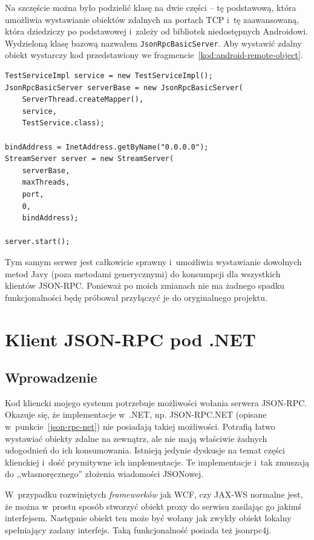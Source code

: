 Na szczęście można było podzielić klasę na dwie części -- tę podstawową, która umożliwia wystawianie obiektów zdalnych na portach TCP i~tę zaawansowaną, która dziedziczy po podstawowej i~zależy od bibliotek niedostępnych Androidowi.
Wydzieloną klasę bazową nazwałem \texttt{JsonRpcBasicServer}. Aby wystawić zdalny obiekt wystarczy kod przedstawiony we fragmencie~\ref{kod:android-remote-object}.

\begin{lstlisting}[float, frame=single, caption={Tworzenie obiektu zdalnego przy pomocy jsonrpc4j dostosowanego do Androida.}, label=kod:android-remote-object]
TestServiceImpl service = new TestServiceImpl();
JsonRpcBasicServer serverBase = new JsonRpcBasicServer(
    ServerThread.createMapper(),
    service,
    TestService.class);
		
bindAddress = InetAddress.getByName("0.0.0.0");
StreamServer server = new StreamServer(
    serverBase,
    maxThreads,
    port,
    0,
    bindAddress);

server.start();
\end{lstlisting}

Tym samym serwer jest całkowicie sprawny i~umożliwia wystawianie dowolnych metod Javy (poza metodami generycznymi) do konsumpcji dla wszystkich klientów JSON-RPC.
Ponieważ po moich zmianach nie ma żadnego spadku funkcjonalności będę próbował przyłączyć je do oryginalnego projektu.



\section{Klient JSON-RPC pod .NET}
\subsection{Wprowadzenie}
Kod kliencki mojego systemu potrzebuje możliwości wołania serwera JSON-RPC.
Okazuje się, że implementacje w~.NET, np. JSON-RPC.NET (opisane w~punkcie~\ref{json-rpc-net}) nie posiadają takiej możliwości.
Potrafią łatwo wystawiać obiekty zdalne na zewnątrz, ale nie mają właściwie żadnych udogodnień do ich konsumowania.
Istnieją jedynie dyskusje na temat części klienckiej i~dość prymitywne ich implementacje.
Te implementacje i~tak zmuszają do ,,własnoręcznego'' złożenia wiadomości JSONowej\cite{json-rpc-net-client}.

W~przypadku rozwiniętych \emph{frameworków} jak WCF, czy JAX-WS normalne jest, że można w~prostu sposób stworzyć obiekt proxy do serwisu zasilając go jakimś interfejsem.
Następnie obiekt ten może być wołany jak zwykły obiekt lokalny spełniający zadany interfejs.
Taką funkcjonalność posiada też jsonrpc4j.

